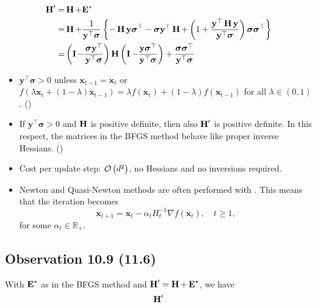 $$
\begin{aligned}
\operatorname{\boldsymbol{\mathbf{H}}}^{\prime}=& \operatorname{\boldsymbol{\mathbf{H}}} + \boldsymbol{\mathbf{E}}^* \\
=&\operatorname{\boldsymbol{\mathbf{H}}}+\frac{1}{\mathbf{y}^{\top} \boldsymbol{\sigma}}\left\{-\operatorname{\boldsymbol{\mathbf{H}}} \mathbf{y} \boldsymbol{\sigma}^{\top}-\boldsymbol{\sigma} \mathbf{y}^{\top} \operatorname{\boldsymbol{\mathbf{H}}}+\left(1+\frac{\mathbf{y}^{\top} \operatorname{\boldsymbol{\mathbf{H}}} \mathbf{y}}{\mathbf{y}^{\top} \boldsymbol{\sigma}}\right) \boldsymbol{\sigma} \boldsymbol{\sigma}^{\top}\right\} \\
=&\left(\operatorname{\boldsymbol{\mathbf{I}}}-\frac{\boldsymbol{\sigma} \mathbf{y}^{\top}}{\mathbf{y}^{\top} \boldsymbol{\sigma}}\right) \operatorname{\boldsymbol{\mathbf{H}}}\left(\operatorname{\boldsymbol{\mathbf{I}}}-\frac{\mathbf{y} \boldsymbol{\sigma}^{\top}}{\mathbf{y}^{\top} \boldsymbol{\sigma}}\right)+\frac{\boldsymbol{\sigma} \boldsymbol{\sigma}^{\top}}{\mathbf{y}^{\top} \boldsymbol{\sigma}}
\end{aligned}
$$
\begin{itemize}[leftmargin=*]
    \item $\mathbf{y}^{\top} \boldsymbol{\sigma}>0$ unless $\mathbf{x}_{t-1}=\mathbf{x}_{t}$ or $f\left(\lambda \mathbf{x}_{\mathrm{t}}+(1-\lambda) \mathbf{x}_{\mathrm{t}-1}\right)=\lambda f\left(\mathbf{x}_{\mathrm{t}}\right)+(1-\lambda) f\left(\mathbf{x}_{\mathrm{t}-1}\right)$ for all $\lambda \in(0,1)$. ()
    \item If $\mathbf{y}^{\top} \boldsymbol{\sigma}>0$ and $\operatorname{\boldsymbol{\mathbf{H}}}$ is positive definite, then also $\operatorname{\boldsymbol{\mathbf{H}}}^{\prime}$ is positive definite. In this respect, the matrices in the BFGS method behave like proper inverse Hessians. ()
    \item Cost per update step: $\operatorname{\mathcal{O}}\left(d^{2}\right)$, no Hessians and no inversions required.
    \item Newton and Quasi-Newton methods are often performed with . This means that the iteration becomes
$$
\mathbf{x}_{t+1}=\mathbf{x}_{t}-\alpha_{t} H_{t}^{-1} \nabla f\left(\mathbf{x}_{t}\right), \quad t \geq 1,
$$
for some $\alpha_{t} \in \mathbb{R}_{+}$.
\end{itemize}









\subsection*{Observation 10.9 (11.6)}
With $\operatorname{\boldsymbol{\mathbf{E}}}^{\star}$ as in the BFGS method and $\operatorname{\boldsymbol{\mathbf{H}}}^{\prime}=\operatorname{\boldsymbol{\mathbf{H}}}+\operatorname{\boldsymbol{\mathbf{E}}}^{\star}$, we have
$$
\operatorname{\boldsymbol{\mathbf{H}}}^{\prime}
$$






